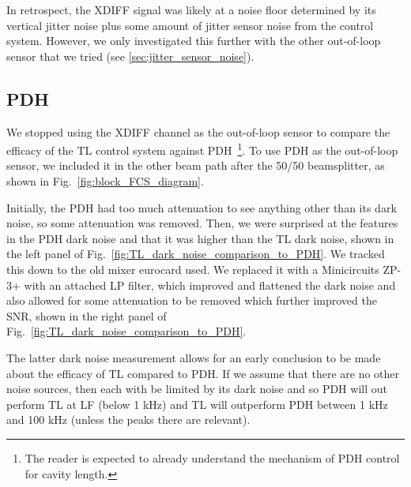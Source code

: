 \documentclass[aps,pra,superscriptaddress,reprint,nofootinbib]{revtex4-1}
\begin{document}
In retrospect, the XDIFF signal was likely at a noise floor determined by its vertical jitter noise plus some amount of jitter sensor noise from the control system. However, we only investigated this further with the other out-of-loop sensor that we tried (see \ref{sec:jitter_sensor_noise}).


\subsection{PDH}
\label{sec:PDH_out-of-loop}

\begin{figure*}
	\caption{SR785 measurements from 2021-01-13/14 of the TL and PDH dark noise. Showing PDH dark noise from the old eurocard mixer (panel a, left) and from the new mixer (panel b, right). The new mixer flattens the PDH dark noise and brings it under TL at LF.}
	\label{fig:TL_dark_noise_comparison_to_PDH}
\end{figure*}

We stopped using the XDIFF channel as the out-of-loop sensor to compare the efficacy of the TL control system against PDH~\footnote{The reader is expected to already understand the mechanism of PDH control for cavity length.}. To use PDH as the out-of-loop sensor, we included it in the other beam path after the 50/50 beamsplitter, as shown in Fig.~\ref{fig:block_FCS_diagram}.

Initially, the PDH had too much attenuation to see anything other than its dark noise, so some attenuation was removed. Then, we were surprised at the features in the PDH dark noise and that it was higher than the TL dark noise, shown in the left panel of Fig.~\ref{fig:TL_dark_noise_comparison_to_PDH}. We tracked this down to the old mixer eurocard used. We replaced it with a Minicircuits ZP-3+ with an attached LP filter, which improved and flattened the dark noise and also allowed for some attenuation to be removed which further improved the SNR, shown in the right panel of Fig.~\ref{fig:TL_dark_noise_comparison_to_PDH}.

The latter dark noise measurement allows for an early conclusion to be made about the efficacy of TL compared to PDH. If we assume that there are no other noise sources, then each with be limited by its dark noise and so PDH will out perform TL at LF (below 1 kHz) and TL will outperform PDH between 1 kHz and 100 kHz (unless the peaks there are relevant).
\end{document}
